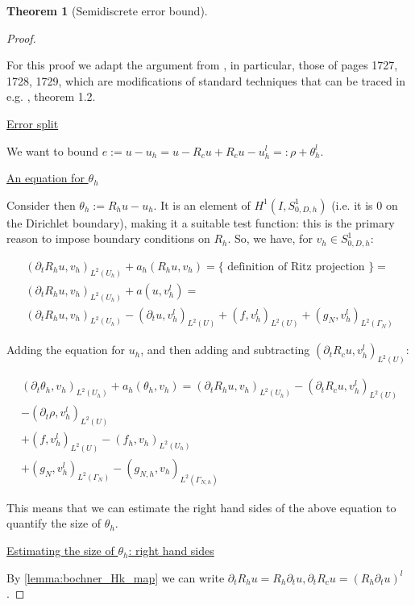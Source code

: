 \documentclass[english,a4paper,9pt,oneside]{scrbook}	%
\theoremstyle{break}
\newtheorem{thm}[equation]{Theorem}
\newenvironment{mproof}[1][\proofname]{%
  \begin{proof}[#1]$ $\par\nobreak\ignorespaces
}{%
  \end{proof}
}
\renewcommand*{\proofname}{Proof}
\theoremstyle{remark}
\newcommand{\ind}[1]{\{\text{ #1 }\}}
\begin{document}
\begin{appendices}
\begin{thm}[Semidiscrete error bound]
\end{thm}

\begin{mproof}

For this proof we adapt the argument from \cite{ranner}, in particular, those of pages 1727, 1728, 1729, which are modifications of standard techniques that can be traced in e.g. \cite{thomee}, theorem 1.2.

\underline{Error split}

We want to bound $e:=u-u_h = u-R_cu +R_c u -u_h^l =: \rho + \theta_h^l$.

\underline{An equation for $\theta_h$}

Consider then $\theta_h := R_h u -u_h$. It is an element of $H^1(I,S^1_{0,D,h})$ (i.e. it is $0$ on the Dirichlet boundary), making it a suitable test function: this is the primary reason to impose boundary conditions on $R_h$.
So, we have, for $v_h \in S^1_{0,D,h}$:

\begin{align*}
(\partial_t R_h u , v_h)_{L^2(U_h)} + a_h(R_h u, v_h) = \ind{definition of Ritz projection}=\\
(\partial_t R_h u , v_h)_{L^2(U_h)} + a(u, v_h^l) =\\
(\partial_t R_h u , v_h)_{L^2(U_h)} - (\partial_t u, v_h^l)_{L^2(U)} + (f, v_h^l)_{L^2(U)} + (g_{N}, v_h^l)_{L^2(\Gamma_{N})} 
\end{align*}

Adding the equation for $u_h$, and then adding and subtracting $(\partial_t R_cu, v_h^l)_{L^2(U)}$:


\begin{align}
\label{eqn:theta}
(\partial_t \theta_h , v_h)_{L^2(U_h)} + a_h(\theta_h, v_h) = 
(\partial_t R_h u , v_h)_{L^2(U_h)} - (\partial_t R_c u , v_h^l)_{L^2(U)}\\
- (\partial_t \rho, v_h^l)_{L^2(U)}\\ + (f, v_h^l)_{L^2(U)} - (f_h, v_h)_{L^2(U_h)}\\ + (g_{N}, v_h^l)_{L^2(\Gamma_{N})} - (g_{N,h}, v_h)_{L^2(\Gamma_{N,h})} 
\end{align}

This means that we can estimate the right hand sides of the above equation to quantify the size of $\theta_h$.

\underline{Estimating the size of $\theta_h$: right hand sides}

By \cref{lemma:bochner_Hk_map} we can write $\partial_t R_h u = R_h \partial_t u, \partial_t R_c u = (R_h \partial_t u)^l$.


\end{mproof}
\end{appendices}
\end{document}

